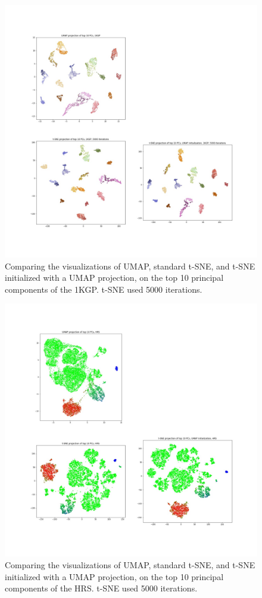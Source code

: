 \documentclass[12pt]{pnas-new}
\begin{document}
\begin{figure}[!htb]
    \centering
    \includegraphics[width=0.95\columnwidth]{images/1KGP_tsne_umap.jpeg}
    \caption{Comparing the visualizations of UMAP, standard t-SNE, and t-SNE initialized with a UMAP projection, on the top 10 principal components of the 1KGP. t-SNE used 5000 iterations.}
    \label{fig:supp_tsne_umap_compare_1kgp}
\end{figure}

\begin{figure}[!htb]
    \centering
    \includegraphics[width=0.95\columnwidth]{images/HRS_tsne_umap.jpeg}
    \caption{Comparing the visualizations of UMAP, standard t-SNE, and t-SNE initialized with a UMAP projection, on the top 10 principal components of the HRS. t-SNE used 5000 iterations.}
    \label{fig:supp_tsne_umap_compare_hrs}
\end{figure}
\end{document}
